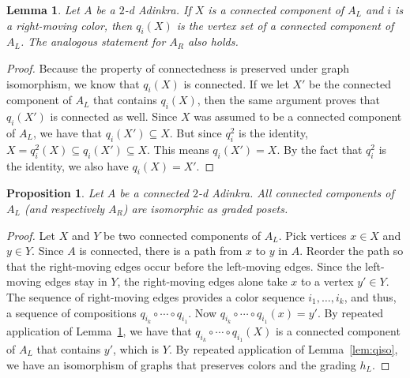 \documentclass[12pt,twoside,singlespace]{article}
\numberwithin{equation}{section}
\newtheorem{lem}[equation]{Lemma}
\newtheorem{prop}[equation]{Proposition}
\theoremstyle{definition}
\begin{document}
\begin{lem}
\label{lem:qiconnected}
Let $A$ be a $2$-d Adinkra.  If $X$ is a connected component of $A_L$ and $i$ is a right-moving color, then $q_i(X)$ is the vertex set of a connected component of $A_L$. The analogous statement for $A_R$ also holds.
\end{lem}
\begin{proof}
Because the property of connectedness is preserved under graph isomorphism, we know that $q_i(X)$ is connected.  If we let $X'$ be the connected component of $A_L$ that contains $q_i(X)$, then the same argument proves that $q_i(X')$ is connected as well.  Since $X$ was assumed to be a connected component of $A_L$, we have that $q_i(X')\subseteq X$.  But since $q_i^2$ is the identity, $X=q_i^2(X)\subseteq q_i(X')\subseteq X$.  This means $q_i(X')=X$.  By the fact that $q_i^2$ is the identity, we also have $q_i(X)=X'$.
\end{proof}

\begin{prop}
\label{prop:kevin}
Let $A$ be a connected $2$-d Adinkra.  All connected components of $A_L$ (and respectively $A_R$) are isomorphic as graded posets.
\end{prop}
\begin{proof}
Let $X$ and $Y$ be two connected components of $A_L$. Pick vertices $x \in X$ and $y \in Y$. Since $A$ is connected, there is a path from $x$ to $y$ in $A$. Reorder the path so that the right-moving edges occur before the left-moving edges. Since the left-moving edges stay in $Y$, the right-moving edges alone take $x$ to a vertex $y' \in Y$.  The sequence of right-moving edges provides a color sequence $i_1,\ldots,i_k$, and thus, a sequence of compositions $q_{i_k}\circ\cdots\circ q_{i_1}$.  Now $q_{i_k}\circ\cdots\circ q_{i_1}(x)=y'$.  By repeated application of Lemma~\ref{lem:qiconnected}, we have that $q_{i_k}\circ\cdots\circ q_{i_1}(X)$ is a connected component of $A_L$ that contains $y'$, which is $Y$.  By repeated application of Lemma~\ref{lem:qiso}, we have an isomorphism of graphs that preserves colors and the grading $h_L$.
\end{proof}

\end{document}
